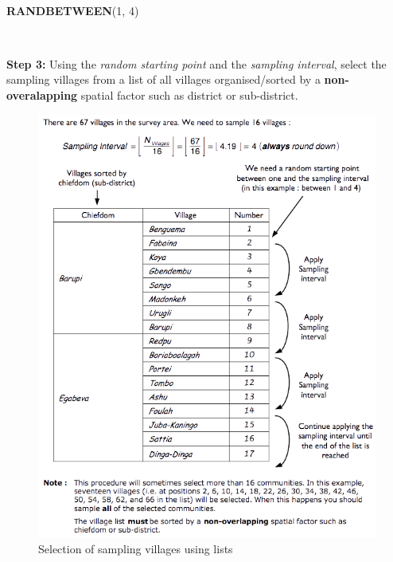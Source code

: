 \documentclass[12pt,a4paper]{book}
\newenvironment{Shaded}{\begin{snugshade}}{\end{snugshade}}
\newcommand{\KeywordTok}[1]{\textcolor[rgb]{0.13,0.29,0.53}{\textbf{#1}}}
\newcommand{\DecValTok}[1]{\textcolor[rgb]{0.00,0.00,0.81}{#1}}
\newcommand{\NormalTok}[1]{#1}
\theoremstyle{definition}
\theoremstyle{definition}
\theoremstyle{definition}
\theoremstyle{remark}
\begin{document}
~

\begin{Shaded}
\begin{Highlighting}[]
\KeywordTok{RANDBETWEEN}\NormalTok{(}\DecValTok{1}\NormalTok{, }\DecValTok{4}\NormalTok{)}
\end{Highlighting}
\end{Shaded}

~

\textbf{Step 3:} Using the \emph{random starting point} and the
\emph{sampling interval}, select the sampling villages from a list of
all villages organised/sorted by a \textbf{non-overalapping} spatial
factor such as district or sub-district.

\newpage

\begin{figure}[H]

{\centering \includegraphics[width=8.38in]{figures/listSample2} 

}

\caption{Selection of sampling villages using lists}\label{fig:sample4}
\end{figure}
\end{document}
